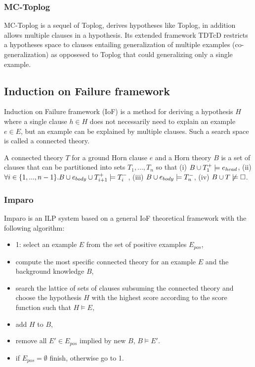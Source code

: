 \subsubsection{MC-Toplog\cite{muggleton2012}}
MC-Toplog is a sequel of Toplog, derives hypotheses like Toplog, in addition allows multiple clauses in a hypothesis. Its extended framework TDTcD restricts a hypotheses space to clauses entailing generalization of multiple examples (co-generalization) as opposesed to Toplog that could generalizing only a single example.

\subsection{Induction on Failure framework\cite{kimber2011}}
Induction on Failure framework (IoF) is a method for deriving a hypothesis $H$ where a single clause $h \in H$ does not necessarily need to explain an example $e \in E$, but an example can be explained by multiple clauses. Such a search space is called a connected theory.
\begin{defn}
A connected theory $T$ for a ground Horn clause $e$ and a Horn theory $B$ is a set of clauses that can be partitioned into sets $T_1, ..., T_n$ so that
(i) $B \cup T_1^+ \models e_{head}$,
(ii) $\forall i \in \{1, ..., n-1\}. B \cup e_{body} \cup T_{i+1}^+ \models T_i^-$,
(iii) $B \cup e_{body} \models T_n^-$,
(iv) $B \cup T \not\models \square$.
\end{defn}

\subsubsection{Imparo\cite{kimber2011}}
Imparo is an ILP system based on a general IoF theoretical framework with the following algorithm:
\begin{itemize}
\item 1: select an example $E$ from the set of positive examples $E_{pos}$,
\item compute the most specific connected theory for an example $E$ and the background knowledge $B$,
\item search the lattice of sets of clauses subsuming the connected theory and choose the hypothesis $H$ with the highest score according to the score function such that $H \models E$,
\item add $H$ to $B$,
\item remove all $E' \in E_{pos}$ implied by new $B$, $B \models E'$.
\item if $E_{pos} = \emptyset$ finish, otherwise go to 1.
\end{itemize}

